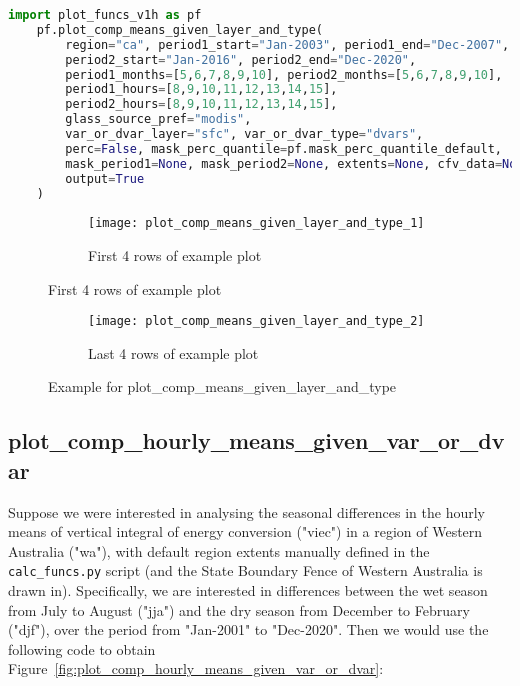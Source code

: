 \begin{lstlisting}[language=Python,caption={Example for plot\_comp\_means\_given\_layer\_and\_type},captionpos=b]
	import plot_funcs_v1h as pf
	pf.plot_comp_means_given_layer_and_type(
		region="ca", period1_start="Jan-2003", period1_end="Dec-2007", 
		period2_start="Jan-2016", period2_end="Dec-2020", 
		period1_months=[5,6,7,8,9,10], period2_months=[5,6,7,8,9,10], 
		period1_hours=[8,9,10,11,12,13,14,15], 
		period2_hours=[8,9,10,11,12,13,14,15], 
		glass_source_pref="modis", 
		var_or_dvar_layer="sfc", var_or_dvar_type="dvars", 
		perc=False, mask_perc_quantile=pf.mask_perc_quantile_default, 
		mask_period1=None, mask_period2=None, extents=None, cfv_data=None, 
		output=True
	)
\end{lstlisting}

\begin{figure}[!htp]
	\centering
    \begin{subfigure}[!htp]{0.9\textwidth}
		\centering
		\texttt{[image: plot\_comp\_means\_given\_layer\_and\_type\_1]}
		\caption[]{First 4 rows of example plot}
	\end{subfigure}
\end{figure}

\begin{figure}[!htp]\ContinuedFloat
    \begin{subfigure}[!htp]{0.9\textwidth}
		\centering
		\texttt{[image: plot\_comp\_means\_given\_layer\_and\_type\_2]}
		\caption[]{Last 4 rows of example plot}
	\end{subfigure}
	\caption{Example for plot\_comp\_means\_given\_layer\_and\_type}
	\label{fig:plot_comp_means_given_layer_and_type}
\end{figure}

\subsection{plot\_comp\_hourly\_means\_given\_var\_or\_dvar}

Suppose we were interested in analysing the seasonal differences in the hourly means of vertical integral of energy conversion ("viec") in a region of Western Australia ("wa"), with default region extents manually defined in the \verb+calc_funcs.py+ script (and the State Boundary Fence of Western Australia is drawn in). Specifically, we are interested in differences between the wet season from July to August ("jja") and the dry season from December to February ("djf"), over the period from "Jan-2001" to "Dec-2020". Then we would use the following code to obtain Figure~\ref{fig:plot_comp_hourly_means_given_var_or_dvar}:

